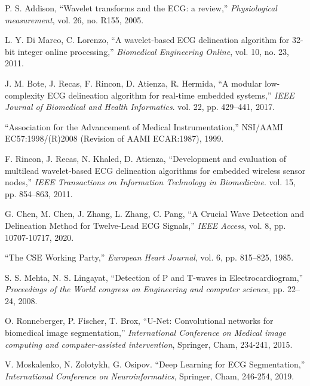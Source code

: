 \documentclass[submitted]{ieeeaccess}
\newcommand{\NewCorrection}[1]{{#1}}
\begin{document}
\begin{thebibliography}{99}
	P. S. Addison, 
	``{W}avelet transforms and the ECG: a review,''
	\emph{Physiological measurement}, vol. 26, no. R155, 2005.
	
    L. Y. Di Marco, C. Lorenzo, 
    ``{A} wavelet-based ECG delineation algorithm for 32-bit integer online processing,''
    \emph{Biomedical Engineering Online}, vol. 10, no. 23, 2011.


    J. M. Bote, J. Recas, F. Rincon, D. Atienza, R. Hermida, 
    ``{A} modular low-complexity ECG delineation algorithm for real-time embedded systems,''
    \emph{IEEE Journal of Biomedical and Health Informatics}. vol. 22, pp. 429--441, 2017.

    ``{A}ssociation for the Advancement of Medical Instrumentation,''
    \newblock NSI/AAMI EC57:1998/(R)2008 (Revision of AAMI ECAR:1987), 1999.

    F. Rincon, J. Recas, N. Khaled, D. Atienza, 
    ``{D}evelopment and evaluation of multilead wavelet-based ECG delineation algorithms for embedded wireless sensor nodes,''
    \emph{IEEE Transactions on Information Technology in Biomedicine}. vol. 15, pp. 854--863, 2011.

    G. Chen, M. Chen, J. Zhang, L. Zhang, C. Pang, 
    ``A Crucial Wave Detection and Delineation Method for Twelve-Lead ECG Signals,'' \emph{IEEE Access}, vol. 8, pp. 10707-10717, 2020.

	

	``{T}he CSE Working Party,''
	\newblock \emph{European Heart Journal}, vol. 6, pp. 815--825, 1985.
	
	S. S. Mehta, N. S. Lingayat, 
	``{D}etection of P and T-waves in Electrocardiogram,''
	\newblock \emph{Proceedings of the World congress on Engineering and computer science}, pp. 22--24, 2008.
	
	\NewCorrection{O. Ronneberger, P. Fischer, T. Brox,  ``U-Net: Convolutional networks for biomedical image segmentation,'' \emph{International Conference on Medical image computing
	and computer-assisted intervention}, Springer, Cham, 234-241, 2015.}
	
	\NewCorrection{V. Moskalenko, N. Zolotykh, G. Osipov. ``Deep Learning for ECG Segmentation,'' \emph{International Conference on Neuroinformatics}, Springer, Cham, 246-254, 2019.}	
	
    
	
\end{thebibliography}
\end{document}
